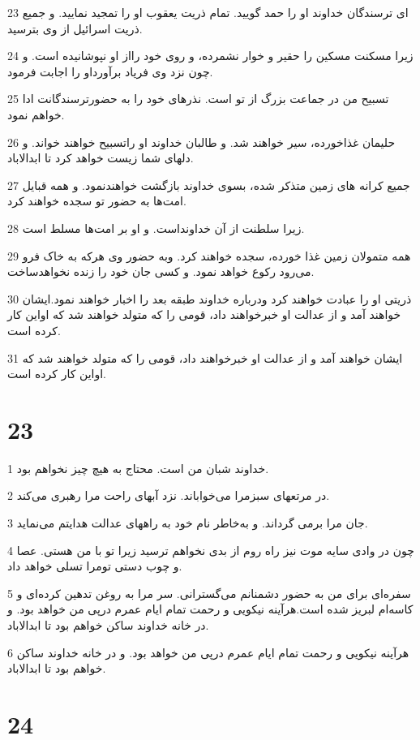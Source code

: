 \par 23 ‌ای ترسندگان خداوند او را حمد گویید. تمام ذریت یعقوب او را تمجید نمایید. و جمیع ذریت اسرائیل از وی بترسید.
\par 24 زیرا مسکنت مسکین را حقیر و خوار نشمرده، و روی خود رااز او نپوشانیده است. و چون نزد وی فریاد برآورداو را اجابت فرمود.
\par 25 تسبیح من در جماعت بزرگ از تو است. نذرهای خود را به حضورترسندگانت ادا خواهم نمود.
\par 26 حلیمان غذاخورده، سیر خواهند شد. و طالبان خداوند او راتسبیح خواهند خواند. و دلهای شما زیست خواهد کرد تا ابدالاباد.
\par 27 جمیع کرانه های زمین متذکر شده، بسوی خداوند بازگشت خواهندنمود. و همه قبایل امت‌ها به حضور تو سجده خواهند کرد.
\par 28 زیرا سلطنت از آن خداونداست. و او بر امت‌ها مسلط است.
\par 29 همه متمولان زمین غذا خورده، سجده خواهند کرد. وبه حضور وی هر‌که به خاک فرو می‌رود رکوع خواهد نمود. و کسی جان خود را زنده نخواهدساخت.
\par 30 ذریتی او را عبادت خواهند کرد ودرباره خداوند طبقه بعد را اخبار خواهند نمود.ایشان خواهند آمد و از عدالت او خبرخواهند داد، قومی را که متولد خواهند شد که اواین کار کرده است.
\par 31 ایشان خواهند آمد و از عدالت او خبرخواهند داد، قومی را که متولد خواهند شد که اواین کار کرده است.
 
\chapter{23}

\par 1 خداوند شبان من است. محتاج به هیچ چیز نخواهم بود.
\par 2 در مرتعهای سبزمرا می‌خواباند. نزد آبهای راحت مرا رهبری می‌کند.
\par 3 جان مرا برمی گرداند. و به‌خاطر نام خود به راههای عدالت هدایتم می‌نماید.
\par 4 چون در وادی سایه موت نیز راه روم از بدی نخواهم ترسید زیرا تو با من هستی. عصا و چوب دستی تومرا تسلی خواهد داد.
\par 5 سفره‌ای برای من به حضور دشمنانم می‌گسترانی. سر مرا به روغن تدهین کرده‌ای و کاسه‌ام لبریز شده است.هرآینه نیکویی و رحمت تمام ایام عمرم در‌پی من خواهد بود. و در خانه خداوند ساکن خواهم بود تا ابدالاباد.
\par 6 هرآینه نیکویی و رحمت تمام ایام عمرم در‌پی من خواهد بود. و در خانه خداوند ساکن خواهم بود تا ابدالاباد.
 
\chapter{24}

